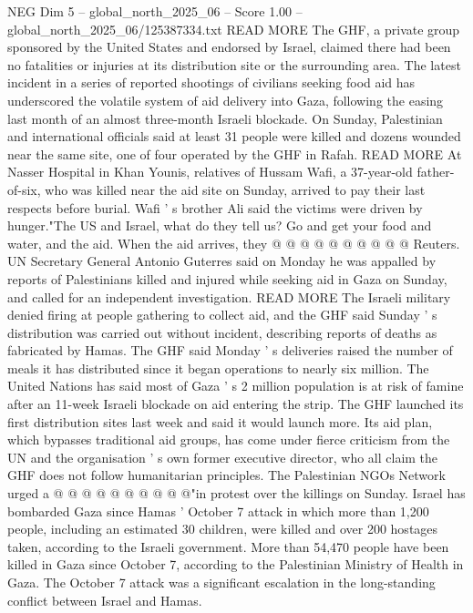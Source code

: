 \begin{textsample}{NEG Dim 5 – global\_north\_2025\_06 – Score 1.00 – global\_north\_2025\_06/125387334.txt}  \label{ex:f5_neg_378}
READ MORE The GHF, a private group sponsored by the United States and endorsed by Israel, claimed there had been no fatalities or injuries at its distribution site or the surrounding area.
The latest incident in a series of reported shootings of civilians seeking food aid has underscored the volatile system of aid delivery into Gaza, following the easing last month of an almost three-month Israeli blockade.
On Sunday, Palestinian and international officials said at least 31 people were killed and dozens wounded near the same site, one of four operated by the GHF in Rafah.
READ MORE At Nasser Hospital in Khan Younis, relatives of Hussam Wafi, a 37-year-old father-of-six, who was killed near the aid site on Sunday, arrived to pay their last respects before burial.
Wafi ' s brother Ali said the victims were driven by hunger."The US and Israel, what do they tell us?
Go and get your food and water, and the aid.
When the aid arrives, they @ @ @ @ @ @ @ @ @ @ Reuters.
UN Secretary General Antonio Guterres said on Monday he was appalled by reports of Palestinians killed and injured while seeking aid in Gaza on Sunday, and called for an independent investigation.
READ MORE The Israeli military denied firing at people gathering to collect aid, and the GHF said Sunday ' s distribution was carried out without incident, describing reports of deaths as fabricated by Hamas.
The GHF said Monday ' s deliveries raised the number of meals it has distributed since it began operations to nearly six million.
The United Nations has said most of Gaza ' s 2 million population is at risk of famine after an 11-week Israeli blockade on aid entering the strip.
The GHF launched its first distribution sites last week and said it would launch more.
Its aid plan, which bypasses traditional aid groups, has come under fierce criticism from the UN and the organisation ' s own former executive director, who all claim the GHF does not follow humanitarian principles.
The Palestinian NGOs Network urged a @ @ @ @ @ @ @ @ @ @"in protest over the killings on Sunday.
Israel has bombarded Gaza since Hamas ' October 7 attack in which more than 1,200 people, including an estimated 30 children, were killed and over 200 hostages taken, according to the Israeli government.
More than 54,470 people have been killed in Gaza since October 7, according to the Palestinian Ministry of Health in Gaza.
The October 7 attack was a significant escalation in the long-standing conflict between Israel and Hamas.

\end{textsample}
